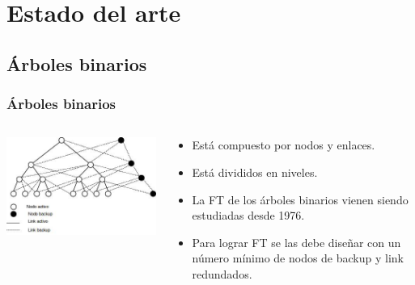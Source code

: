 \section{Estado del arte}
\subsection{Árboles binarios}

\begin{frame}
    \frametitle{Árboles binarios}
    \begin{columns}[T]
    	\begin{column}{.5\textwidth}
    		\includegraphics[scale=0.6]{images/binary_tree.jpg}
    	\end{column}
    	\begin{column}{.5\textwidth}
    		\begin{itemize}
    			\item Está compuesto por nodos y enlaces.
    			\item Está divididos en niveles. 
    			\item La FT de los árboles binarios vienen siendo estudiadas desde 1976.
    			\item Para lograr FT se las debe diseñar con un número mínimo de nodos de backup y link redundados. 
    		\end{itemize}
    	\end{column}
    \end{columns}
\end{frame}

